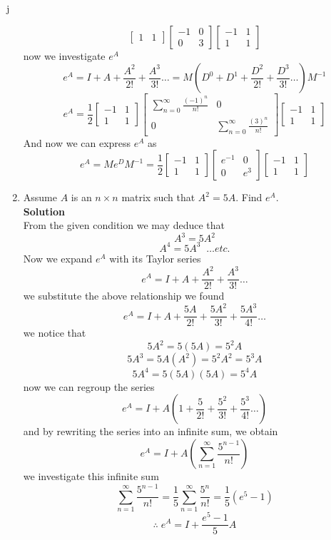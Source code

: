 j\documentclass[12pt]{article}
\begin{document}
\begin{enumerate}
\[\begin{bmatrix}
1 & 1
\end{bmatrix}
\begin{bmatrix}
-1 & 0 \\
0 & 3
\end{bmatrix}
\begin{bmatrix}
-1 & 1 \\
1 & 1
\end{bmatrix}
\]
now we investigate $e^A$
\[
e^A=I+A+\frac{A^2}{2!}+\frac{A^3}{3!}\ldots = M(D^{0}+D^{1}+\frac{D^2}{2!}+\frac{D^3}{3!}\ldots)M^{-1}
\]
\[
e^A=
\frac{1}{2}
\begin{bmatrix}
-1 & 1 \\
1 & 1
\end{bmatrix}
\begin{bmatrix}
    \sum_{n=0}^{\infty} \frac{(-1)^n}{n!}&0\\
    0&\sum_{n=0}^{\infty} \frac{(3)^n}{n!}
\end{bmatrix}
\begin{bmatrix}
-1 & 1 \\
1 & 1
\end{bmatrix}
\]
And now we can express $e^A$ as 
\[
e^{A}= Me^DM^{-1}=
\frac{1}{2}
\begin{bmatrix}
-1 & 1 \\
1 & 1
\end{bmatrix}
\begin{bmatrix}
e^{-1} & 0 \\
0 & e^3
\end{bmatrix}
\begin{bmatrix}
-1 & 1 \\
1 & 1
\end{bmatrix}
\]





\item Assume $A$ is an $n \times n$ matrix such that $A^{2} = 5 A$.  Find $e^{A}$.\\
\textbf{Solution}\\
From the given condition we may deduce that 
\[
A^3=5A^2
\]
\[
A^4=5A^3 \;\;\ldots etc. 
\]
Now we expand $e^A$ with its Taylor series
\[
e^A=I+A+\frac{A^2}{2!}+\frac{A^3}{3!}\ldots
\]
we substitute the above relationship we found
\[
e^A=I+A+\frac{5A}{2!}+\frac{5A^2}{3!}+\frac{5A^3}{4!}\ldots 
\]
we notice that 
\[
5A^2=5(5A)=5^2A
\]
\[
5A^3=5A(A^2)=5^2A^2=5^3A
\]
\[
5A^4=5(5A)(5A)=5^4A
\]
now we can regroup the series
\[
e^A=I+A(1+\frac{5}{2!}+\frac{5^2}{3!}+\frac{5^3}{4!}\ldots )
\]
and by rewriting the series into an infinite sum, we obtain
\[
e^A=I+A\left(
\sum_{n=1}^{\infty} \frac{5^{n-1}}{n!}
\right)
\]
we investigate this infinite sum
\[
\sum_{n=1}^{\infty} \frac{5^{n-1}}{n!} = \frac{1}{5}\sum_{n=1}^{\infty} \frac{5^{n}}{n!} = \frac{1}{5}(e^5-1)
\]
\[
\therefore \; e^A = I+\frac{e^5-1}{5}A
\]

	
\end{enumerate}
\end{document}
